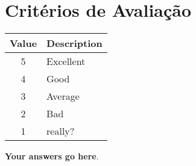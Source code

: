 \documentclass{article}
\begin{document}
\bigskip

\section*{Critérios de Avaliação}

\begin{tabular}{|c|p{2cm}|} \hline
  \textbf{Value} & \textbf{Description} \\ \hline
  5 & Excellent \\ \hline
  4 & Good  \\ \hline 
  3 & Average  \\ \hline 
  2 & Bad \\ \hline 
  1 & really? \\ \hline 
\end{tabular}

\bigskip 

\bigskip 

\bigskip

\textbf{Your answers go here}.
\end{document}
